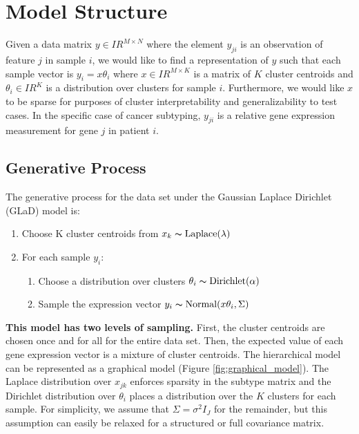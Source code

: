 \documentclass[11pt]{amsart}
\newcommand{\RR}{I\!\!R} %
\begin{document}
\section{Model Structure}

Given a data matrix $y \in \RR^{M \times N}$ where the element $y_{ji}$ is an observation of feature $j$ in sample $i$, we would like to find a representation of $y$ such that each sample vector is $y_i = x\theta_i$ where $x \in \RR^{M \times K}$ is a matrix of $K$ cluster centroids and $\theta_i \in \RR^K$ is a distribution over clusters for sample $i$. Furthermore, we would like $x$ to be sparse for purposes of cluster interpretability and generalizability to test cases. In the specific case of cancer subtyping, $y_{ji}$ is a relative gene expression measurement for gene $j$ in patient $i$. 

\subsection{Generative Process}\label{subset:gen_process}
The generative process for the data set under the Gaussian Laplace Dirichlet (GLaD) model is:
\begin{enumerate}
\item Choose K cluster centroids from $x_k \thicksim \text{Laplace}(\lambda)$
\item For each sample $y_i$:
	\begin{enumerate}
	\item Choose a distribution over clusters $\theta_i \thicksim \text{Dirichlet}(\alpha)$
	\item Sample the expression vector $y_i \thicksim \text{Normal}(x\theta_i, \Sigma)$
	\end{enumerate}
\end{enumerate}

{\bf This model has two levels of sampling.} First, the cluster centroids are chosen once and for all for the entire data set. Then, the expected value of each gene expression vector is a mixture of cluster centroids.  The hierarchical model can be represented as a graphical model (Figure \ref{fig:graphical_model}). The Laplace distribution over $x_{jk}$ enforces sparsity in the subtype matrix \cite{Kabn 2007} and the Dirichlet distribution over $\theta_i$ places a distribution over the $K$ clusters for each sample. For simplicity, we assume that $\Sigma = \sigma^2 I_J$ for the remainder, but this assumption can easily be relaxed for a structured or full covariance matrix.
\end{document}
